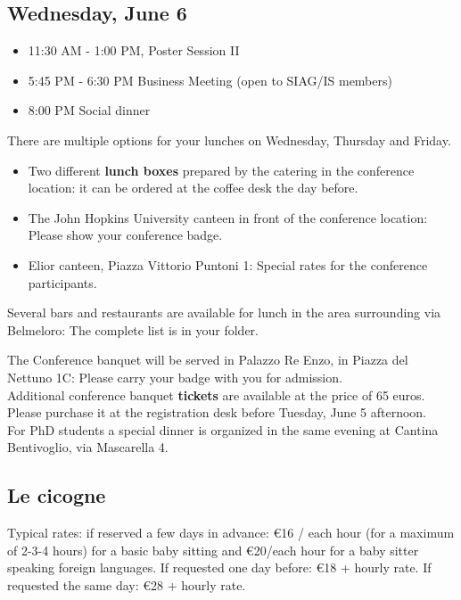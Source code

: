 \subsection*{Wednesday, June 6}

\begin{itemize}
  \item[] 11:30 AM - 1:00 PM, Poster Session II
  \item[] 5:45 PM - 6:30 PM Business Meeting (open to SIAG/IS members)
  \item[] 8:00 PM Social dinner
\end{itemize}

There are multiple options for your lunches on Wednesday, Thursday and Friday. 
\bigskip
\begin{itemize}
  \item Two different \textbf{lunch boxes} prepared by the catering in the conference location: it can be ordered at the coffee desk the day before.
  \item The John Hopkins University canteen in front of the conference location: Please show your conference badge.
  \item Elior canteen, Piazza Vittorio Puntoni 1: Special rates for the conference participants.
\end{itemize}
\bigskip
Several bars and restaurants are available for lunch in the area surrounding via Belmeloro: The complete list is in your folder.

The Conference banquet will be served in Palazzo Re Enzo, in Piazza del Nettuno 1C: Please carry your badge with you for admission.\\ 
Additional conference banquet \textbf{tickets} are available at the price of 65 euros. 
Please purchase it at the registration desk before Tuesday, June 5 afternoon.\\
For PhD students a special dinner is organized in the same evening at Cantina Bentivoglio, via Mascarella 4.

\subsection*{Le cicogne} 
Typical rates: if reserved a few days in advance: \euro 16 / each hour (for a maximum of 2-3-4 hours) for a basic baby sitting and \euro 20/each hour for a baby sitter speaking foreign languages.
If requested one day before: \euro 18 + hourly rate.
If requested the same day: \euro 28 + hourly rate.

